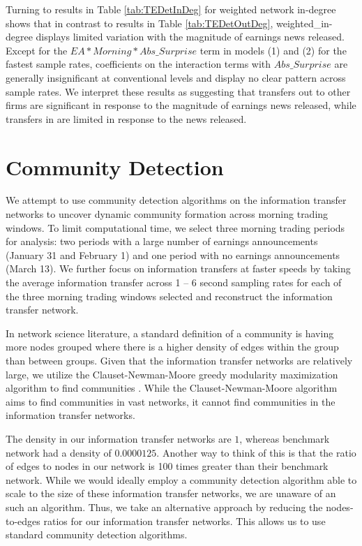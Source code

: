 Turning to results in Table \ref{tab:TEDetInDeg} for weighted network in-degree shows that in contrast to results in Table \ref{tab:TEDetOutDeg},  weighted\_in-degree displays limited variation with the magnitude of earnings news released. Except for the \(EA*Morning*Abs\_Surprise\) term in models (1) and (2) for the fastest sample rates, coefficients on the interaction terms with \(Abs\_Surprise\) are generally insignificant at conventional levels and display no clear pattern across sample rates. We interpret these results as suggesting that transfers out to other firms are significant in response to the magnitude of earnings news released, while transfers in are limited in response to the news released.

\section{Community Detection}

We attempt to use community detection algorithms on the information transfer networks to uncover dynamic community formation across morning trading windows.  To limit computational time, we select three morning trading periods for analysis: two periods with a large number of earnings announcements (January 31 and February 1) and one period with no earnings announcements (March 13). We further focus on information transfers at faster speeds by taking the average information transfer across 1 – 6 second sampling rates for each of the three morning trading windows selected and reconstruct the information transfer network.  

In network science literature,  a standard definition of a community is having more nodes grouped where there is a higher density of edges within the group than between groups.  Given that the information transfer networks are relatively large, we utilize the Clauset-Newman-Moore greedy modularity maximization algorithm to find communities \citep[see][]{Clauset2005}.  While the Clauset-Newman-Moore algorithm aims to find communities in vast networks, it cannot find communities in the information transfer networks. 

The density in our information transfer networks are \(1\), whereas \cite{Clauset2005} benchmark network had a density of \(0.0000125\). Another way to think of this is that the ratio of edges to nodes in our network is 100 times greater than their benchmark network.  While we would ideally employ a community detection algorithm able to scale to the size of these information transfer networks, we are unaware of an such an algorithm.  Thus, we take an alternative approach by reducing the nodes-to-edges ratios for our information transfer networks. This allows us to use standard community detection algorithms.  


